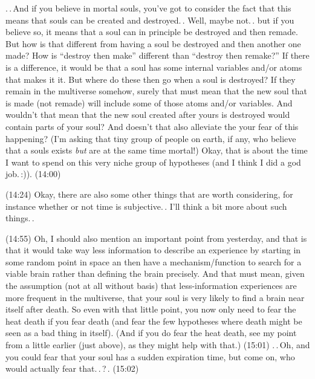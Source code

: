 \documentclass{report}
\begin{document}
.\,.\,And if you believe in mortal souls, you've got to consider the fact that this means that souls can be created and destroyed.\,. Well, maybe not.\,. but if you believe so, it means that a soul can in principle be destroyed and then remade. But how is that different from having a soul be destroyed and then another one made? How is ``destroy then make'' different than ``destroy then remake?'' If there is a difference, it would be that a soul has some internal variables and/or atoms that makes it it. But where do these then go when a soul is destroyed? If they remain in the multiverse somehow, surely that must mean that the new soul that is made (not remade) will include some of those atoms and/or variables. And wouldn't that mean that the new soul created after yours is destroyed would contain parts of your soul? And doesn't that also alleviate the your fear of this happening? (I'm asking that tiny group of people on earth, if any, who believe that a souls exists \emph{but} are at the same time mortal!) Okay, that is about the time I want to spend on this very niche group of hypotheses (and I think I did a god job.\,:)). (14:00)

(14:24) Okay, there are also some other things that are worth considering, for instance whether or not time is subjective.\,. I'll think a bit more about such things.\,.

(14:55) Oh, I should also mention an important point from yesterday, and that is that it would take way less information to describe an experience by starting in some random point in space an then have a mechanism/function to search for a viable brain rather than defining the brain precisely. And that must mean, given the assumption (not at all without basis) that less-information experiences are more frequent in the multiverse, that your soul is very likely to find a brain near itself after death. So even with that little point, you now only need to fear the heat death if you fear death (and fear the few hypotheses where death might be seen as a bad thing in itself). (And if you do fear the heat death, see my point from a little earlier (just above), as they might help with that.) (15:01) .\,.\,Oh, and you could fear that your soul has a sudden expiration time, but come on, who would actually fear that.\,.\,?\,. (15:02)
\end{document}
